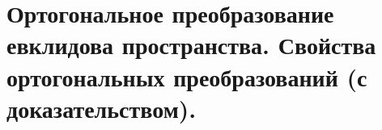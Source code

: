 \section{
    Ортогональное преобразование евклидова пространства. Свойства ортогональных преобразований (с доказательством).
}

